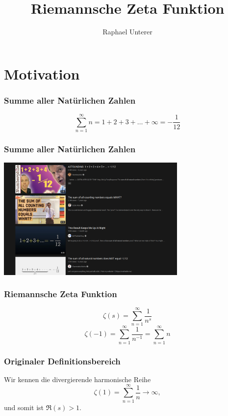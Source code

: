 \documentclass[ngerman, aspectratio=169]{beamer}
\title{Riemannsche Zeta Funktion}
\author{Raphael Unterer}
\institute{Mathematisches Seminar 2022: Spezielle Funktionen}
\begin{document}
	\begin{frame}
		\titlepage
	\end{frame}


	\section{Motivation}

    \begin{frame}
        \frametitle{Summe aller Natürlichen Zahlen}
        \begin{equation*}
            \sum_{n=1}^{\infty} n
            =
            1 + 2 + 3 + \ldots + \infty
            =
            - \frac{1}{12}
        \end{equation*}
    \end{frame}
    \begin{frame}
        \frametitle{Summe aller Natürlichen Zahlen}
        \begin{center}
            \includegraphics[width=0.7\textwidth]{youtube_screenshot.png}
        \end{center}
    \end{frame}
    \begin{frame}
        \frametitle{Riemannsche Zeta Funktion}
        \begin{equation*}
            \zeta(s)
            =
            \sum_{n=1}^{\infty}
            \frac{1}{n^s}
        \end{equation*}
        \pause
        \begin{equation*}
            \zeta(-1)
            =
            \sum_{n=1}^{\infty}
            \frac{1}{n^{-1}}
            =
            \sum_{n=1}^{\infty} n
        \end{equation*}
    \end{frame}
    \begin{frame}
        \frametitle{Originaler Definitionsbereich}
        Wir kennen die divergierende harmonische Reihe
        \begin{equation*}
            \zeta(1)
            =
            \sum_{n=1}^{\infty}
            \frac{1}{n}
            \rightarrow
            \infty,
        \end{equation*}
        und somit ist $\Re(s) > 1$.
    \end{frame}
\end{document}
